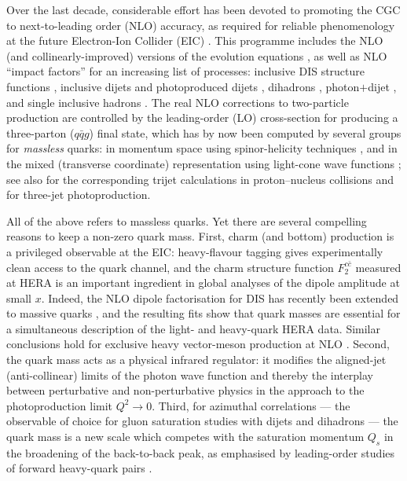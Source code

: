 \documentclass[11pt,a4paper]{article}
\numberwithin{equation}{section}
\begin{document}
Over the last decade, considerable effort has been devoted to promoting the CGC to
next-to-leading order (NLO) accuracy, as required for reliable phenomenology at the future
Electron-Ion Collider (EIC) \cite{Accardi:2012qut,AbdulKhalek:2021gbh}. This programme includes
the NLO (and collinearly-improved) versions of the evolution equations
\cite{Balitsky:2008zza,Balitsky:2013fea,Kovner:2013ona,Beuf:2014uia,Iancu:2015vea}, as well as
NLO ``impact factors'' for an increasing list of processes: inclusive DIS structure functions
\cite{Balitsky:2010ze,Beuf:2011xd,Beuf:2016wdz,Hanninen:2017ddy}, inclusive dijets
\cite{Caucal:2021ent,Caucal:2022ulg} and photoproduced dijets \cite{Taels:2022tza}, dihadrons
\cite{Bergabo:2022tcu,Bergabo:2023wed,Iancu:2022gpw}, photon$+$dijet \cite{Roy:2019hwr}, and
single inclusive hadrons \cite{Bergabo:2022zhe,Bergabo:2024ivx}. The real NLO corrections to
two-particle production are controlled by the leading-order (LO) cross-section for producing a
three-parton ($q\bar q g$) final state, which has by now been computed by several groups for
\emph{massless} quarks: in momentum space using spinor-helicity techniques
\cite{Ayala:2016lhd,Ayala:2017rmh}, and in the mixed (transverse coordinate) representation
using light-cone wave functions \cite{Iancu:2022gpw}; see also
\cite{Iancu:2018hwa,Caucal:2026xxx} for the corresponding trijet calculations in proton--nucleus
collisions and \cite{Altinoluk:2020qet} for three-jet photoproduction.

All of the above refers to massless quarks. Yet there are several compelling reasons to keep a
non-zero quark mass. First, charm (and bottom) production is a privileged observable at the
EIC: heavy-flavour tagging gives experimentally clean access to the quark channel, and the
charm structure function $F_2^{c\bar c}$ measured at HERA \cite{H1:2012xnw} is an important
ingredient in global analyses of the dipole amplitude at small $x$. Indeed, the NLO dipole
factorisation for DIS has recently been extended to massive quarks
\cite{Beuf:2021qqa,Beuf:2021srj,Beuf:2022ndu}, and the resulting fits
\cite{Hanninen:2022gje,Hanninen:2023dki} show that quark masses are essential for a
simultaneous description of the light- and heavy-quark HERA data. Similar conclusions hold for
exclusive heavy vector-meson production at NLO \cite{Mantysaari:2022kdm}. Second, the quark
mass acts as a physical infrared regulator: it modifies the aligned-jet (anti-collinear) limits
of the photon wave function and thereby the interplay between perturbative and
non-perturbative physics in the approach to the photoproduction limit $Q^2\to 0$. Third, for
azimuthal correlations --- the observable of choice for gluon saturation studies with dijets
and dihadrons \cite{Marquet:2007vb,Albacete:2010pg,Dominguez:2011wm,Mueller:2013wwa} --- the
quark mass is a new scale which competes with the saturation momentum $Q_s$ in the broadening
of the back-to-back peak, as emphasised by leading-order studies of forward heavy-quark pairs
\cite{Altinoluk:2021ygv}.
\end{document}
